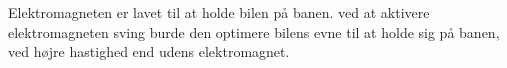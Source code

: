 
Elektromagneten er lavet til at holde bilen på banen. ved at aktivere elektromagneten sving burde den optimere bilens evne til at holde sig på banen, ved højre hastighed end udens elektromagnet.
